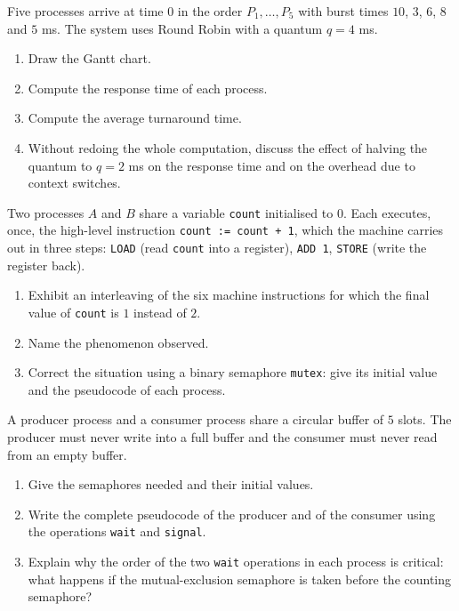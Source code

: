 \documentclass[11pt]{article}
\begin{document}
\begin{exercice}
Five processes arrive at time $0$ in the order $P_1, \dots, P_5$ with burst times $10$, $3$, $6$, $8$ and $5$ ms. The system uses Round Robin with a quantum $q = 4$ ms.
\begin{enumerate}
\item Draw the Gantt chart.
\item Compute the response time of each process.
\item Compute the average turnaround time.
\item Without redoing the whole computation, discuss the effect of halving the quantum to $q = 2$ ms on the response time and on the overhead due to context switches.
\end{enumerate}
\end{exercice}

\begin{exercice}
Two processes $A$ and $B$ share a variable \texttt{count} initialised to $0$. Each executes, once, the high-level instruction \texttt{count := count + 1}, which the machine carries out in three steps: \texttt{LOAD} (read \texttt{count} into a register), \texttt{ADD 1}, \texttt{STORE} (write the register back).
\begin{enumerate}
\item Exhibit an interleaving of the six machine instructions for which the final value of \texttt{count} is $1$ instead of $2$.
\item Name the phenomenon observed.
\item Correct the situation using a binary semaphore \texttt{mutex}: give its initial value and the pseudocode of each process.
\end{enumerate}
\end{exercice}

\begin{exercice}
A producer process and a consumer process share a circular buffer of $5$ slots. The producer must never write into a full buffer and the consumer must never read from an empty buffer.
\begin{enumerate}
\item Give the semaphores needed and their initial values.
\item Write the complete pseudocode of the producer and of the consumer using the operations \texttt{wait} and \texttt{signal}.
\item Explain why the order of the two \texttt{wait} operations in each process is critical: what happens if the mutual-exclusion semaphore is taken before the counting semaphore?
\end{enumerate}
\end{exercice}
\end{document}
